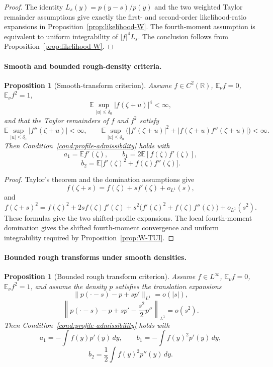 \documentclass[11pt]{article}
\newtheorem{proposition}[theorem]{Proposition}
\theoremstyle{definition}
\theoremstyle{remark}
\newcommand{\E}{\mathbb E}
\begin{document}
\begin{proof}
The identity \(L_s(y)=p(y-s)/p(y)\) and the two weighted Taylor remainder assumptions give exactly the first- and second-order likelihood-ratio expansions in Proposition~\ref{prop:likelihood-W}.  The fourth-moment assumption is equivalent to uniform integrability of \(|f|^4L_s\).  The conclusion follows from Proposition~\ref{prop:likelihood-W}.
\end{proof}

\paragraph{Smooth and bounded rough-density criteria.}

\begin{proposition}[Smooth-transform criterion]
\label{prop:smooth-transform-W}
Assume \(f\in C^2(\mathbb R)\), \(\E_\nu f=0\),
\(\E_\nu f^2=1\),
\[
        \E\sup_{|u|\le\delta_0}|f(\zeta+u)|^4<\infty,
\]
and that the Taylor remainders of \(f\) and \(f^2\) satisfy
\[
        \E\sup_{|u|\le\delta_0}|f''(\zeta+u)|<\infty,
        \qquad
        \E\sup_{|u|\le\delta_0}\bigl(|f'(\zeta+u)|^2+|f(\zeta+u)f''(\zeta+u)|\bigr)<\infty.
\]
Then Condition~\ref{cond:profile-admissibility} holds with
\[
        a_1=\E f'(\zeta),
        \qquad
        b_1=2\E[f(\zeta)f'(\zeta)],
\]
\[
        b_2=\E\bigl[f'(\zeta)^2+f(\zeta)f''(\zeta)\bigr].
\]
\end{proposition}

\begin{proof}
Taylor's theorem and the domination assumptions give
\[
        f(\zeta+s)=f(\zeta)+sf'(\zeta)+o_{L^1}(s),
\]
and
\[
        f(\zeta+s)^2=f(\zeta)^2+2sf(\zeta)f'(\zeta)
        +s^2\bigl(f'(\zeta)^2+f(\zeta)f''(\zeta)\bigr)+o_{L^1}(s^2).
\]
These formulas give the two shifted-profile expansions.  The local fourth-moment domination gives the shifted fourth-moment convergence and uniform integrability required by Proposition~\ref{prop:W-TUI}.
\end{proof}

\paragraph{Bounded rough transforms under smooth densities.}

\begin{proposition}[Bounded rough transform criterion]
\label{prop:bounded-rough-W}
Assume \(f\in L^\infty\), \(\E_\nu f=0\), \(\E_\nu f^2=1\), and assume the density \(p\) satisfies the translation expansions
\[
        \|p(\cdot-s)-p+s p'\|_{L^1}=o(|s|),
\]
\[
        \left\|p(\cdot-s)-p+s p'-\frac{s^2}{2}p''\right\|_{L^1}=o(s^2).
\]
Then Condition~\ref{cond:profile-admissibility} holds with
\[
        a_1=-\int f(y)p'(y)\,dy,
        \qquad
        b_1=-\int f(y)^2p'(y)\,dy,
\]
\[
        b_2=\frac12\int f(y)^2p''(y)\,dy.
\]
\end{proposition}
\end{document}
